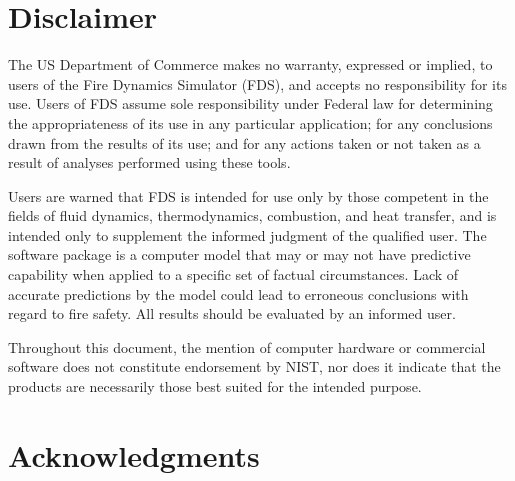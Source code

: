 \documentclass[11pt]{book}
\begin{document}
\chapter{Disclaimer}

The US Department of Commerce makes no warranty, expressed or implied, to
users of the Fire Dynamics Simulator (FDS), and accepts no responsibility for its
use. Users of FDS assume sole responsibility under Federal law for
determining the appropriateness of its use in any particular application;
for any conclusions drawn from the results of its use; and for any actions
taken or not taken as a result of analyses performed using these tools.

Users are warned that FDS is intended for use only by those competent in
the fields of fluid dynamics, thermodynamics, combustion, and heat transfer,
and is intended only to supplement the
informed judgment of the qualified user. The software package is a
computer model that may or may not have predictive capability when applied
to a specific set of factual circumstances. Lack of accurate predictions by
the model could lead to erroneous conclusions with regard to fire safety.
All results should be evaluated by an informed user.

Throughout this document, the mention of computer hardware or
commercial software does not constitute endorsement by NIST, nor does
it indicate that the products are necessarily those best suited for the
intended purpose.


\chapter{Acknowledgments}
\end{document}
